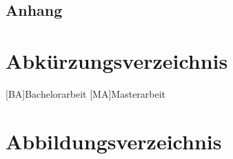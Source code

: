 \documentclass[12pt,a4paper,bibliography=totoc,listof=totoc]{scrartcl}
\begin{document}
\begin{appendix}
\section*{Anhang}
{}


\end{appendix}
\section{Abkürzungsverzeichnis}
\begin{acronym}[KDE]
	[BA]{Bachelorarbeit}
	[MA]{Masterarbeit}

\end{acronym}
\pagebreak


\section {Abbildungsverzeichnis}
\listoffigures
\pagebreak

\listoftables
\pagebreak


\renewcommand\refname{Literaturverzeichnis}
\lhead{}
%


\pagebreak
\end{document}
